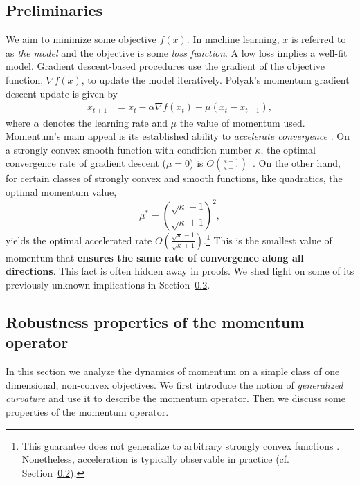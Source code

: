 \documentclass{article}
\newcommand{\yell}[1]{#1}
\begin{document}
\subsection{Preliminaries}
\label{sec:robust_preliminaries}
We aim to minimize some objective $f(x)$.
In machine learning, $x$ is referred to as {\em the model} and the objective is some {\em loss function}.
A low loss implies a well-fit model.
Gradient descent-based procedures use the gradient of the objective function, $\nabla f(x)$, to update the model iteratively.
Polyak's momentum gradient descent update \citep{polyak1964some} is given by
\begin{align}
	x_{t+1}  &= x_t - \alpha \nabla f(x_t) + \mu (x_t - x_{t-1}),
	\label{eqn:momentum_gd}
\end{align} 
where $\alpha$ denotes the learning rate and $\mu$ the value of momentum used.
Momentum's main appeal is its established ability to {\em accelerate convergence} \cite{polyak1964some}. 
On a strongly convex smooth function with condition number $\kappa$, the optimal convergence rate of gradient descent ($\mu=0$)
 is $O(\frac{\kappa-1}{\kappa+1})$~\cite{nesterov2013introductory}.
\yell{On the other hand, for certain classes of strongly convex and smooth functions, like quadratics,  the optimal momentum value,
\begin{equation}
	\mu^* = \left(\frac{\sqrt{\kappa}-1}{\sqrt{\kappa}+1}\right)^2,
	\label{eqn:optimal_momentum}
\end{equation}
yields the optimal accelerated rate $O(\frac{\sqrt{\kappa}-1}{\sqrt{\kappa}+1})$}.\footnote{
\yell{
This guarantee does not generalize to arbitrary strongly convex functions \cite{lessard2016analysis}.
Nonetheless, acceleration is typically observable in practice (cf. Section~\ref{sec:robust_properties}).
}
}
This is the smallest value of momentum that {\bf ensures the same rate of convergence along all directions}.
This fact is often hidden away in proofs. 
We shed light on some of its previously unknown implications in Section~\ref{sec:robust_properties}. %



\subsection{Robustness properties of the momentum operator}
\label{sec:robust_properties}
In this section we analyze the dynamics of momentum on a simple class of one dimensional, non-convex objectives.
We first introduce the notion of {\em generalized curvature} and use it to describe the momentum operator.
Then we discuss some properties of the momentum operator.
\end{document}
